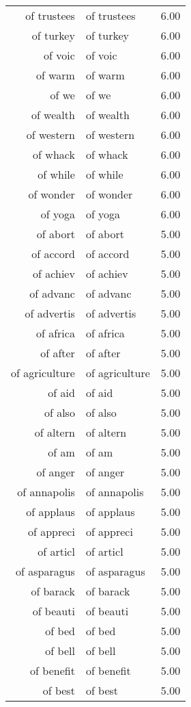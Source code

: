 \begin{table}[ht]
\begin{tabular}{rlr}
  of trustees & of trustees & 6.00 \\ 
  of turkey & of turkey & 6.00 \\ 
  of voic & of voic & 6.00 \\ 
  of warm & of warm & 6.00 \\ 
  of we & of we & 6.00 \\ 
  of wealth & of wealth & 6.00 \\ 
  of western & of western & 6.00 \\ 
  of whack & of whack & 6.00 \\ 
  of while & of while & 6.00 \\ 
  of wonder & of wonder & 6.00 \\ 
  of yoga & of yoga & 6.00 \\ 
  of abort & of abort & 5.00 \\ 
  of accord & of accord & 5.00 \\ 
  of achiev & of achiev & 5.00 \\ 
  of advanc & of advanc & 5.00 \\ 
  of advertis & of advertis & 5.00 \\ 
  of africa & of africa & 5.00 \\ 
  of after & of after & 5.00 \\ 
  of agriculture & of agriculture & 5.00 \\ 
  of aid & of aid & 5.00 \\ 
  of also & of also & 5.00 \\ 
  of altern & of altern & 5.00 \\ 
  of am & of am & 5.00 \\ 
  of anger & of anger & 5.00 \\ 
  of annapolis & of annapolis & 5.00 \\ 
  of applaus & of applaus & 5.00 \\ 
  of appreci & of appreci & 5.00 \\ 
  of articl & of articl & 5.00 \\ 
  of asparagus & of asparagus & 5.00 \\ 
  of barack & of barack & 5.00 \\ 
  of beauti & of beauti & 5.00 \\ 
  of bed & of bed & 5.00 \\ 
  of bell & of bell & 5.00 \\ 
  of benefit & of benefit & 5.00 \\ 
  of best & of best & 5.00 \\ 

\end{tabular}
\end{table}
